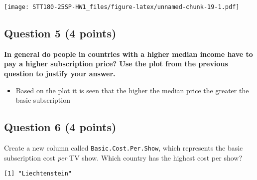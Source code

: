\documentclass[
]{article}
\newenvironment{Shaded}{\begin{snugshade}}{\end{snugshade}}
\newcommand{\FunctionTok}[1]{\textcolor[rgb]{0.13,0.29,0.53}{\textbf{#1}}}
\newcommand{\NormalTok}[1]{#1}
\newcommand{\OtherTok}[1]{\textcolor[rgb]{0.56,0.35,0.01}{#1}}
\newcommand{\SpecialCharTok}[1]{\textcolor[rgb]{0.81,0.36,0.00}{\textbf{#1}}}
\providecommand{\tightlist}{%
  \setlength{\itemsep}{0pt}\setlength{\parskip}{0pt}}
\begin{document}
\texttt{[image: STT180-25SP-HW1\_files/figure-latex/unnamed-chunk-19-1.pdf]}

\subsection{Question 5 (4 points)}\label{question-5-4-points-1}

\textbf{In general do people in countries with a higher median income
have to pay a higher subscription price? Use the plot from the previous
question to justify your answer.}

\begin{itemize}
\tightlist
\item
  Based on the plot it is seen that the higher the median price the
  greater the basic subscription
\end{itemize}

\subsection{Question 6 (4 points)}\label{question-6-4-points}

Create a new column called \texttt{Basic.Cost.Per.Show}, which
represents the basic subscription cost \emph{per} TV show. Which country
has the highest cost per show?

\begin{Shaded}
\end{Shaded}

\begin{verbatim}
[1] "Liechtenstein"
\end{verbatim}
\end{document}
